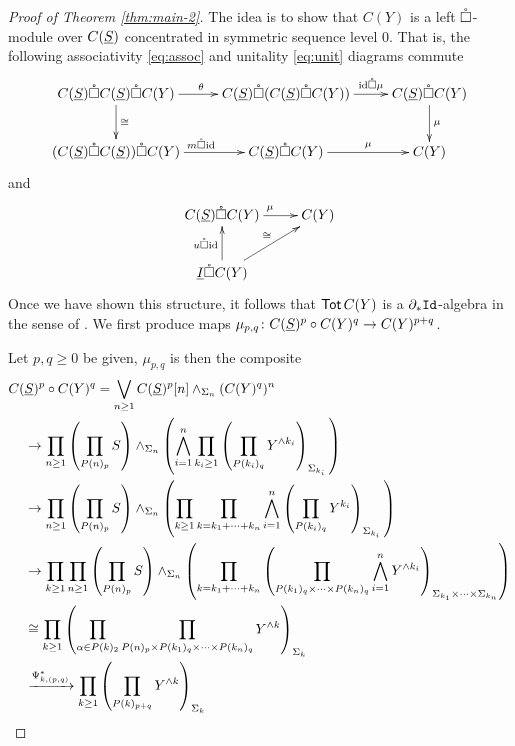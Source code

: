 \begin{proof}[Proof of Theorem \ref{thm:main-2}]The idea is to show that $C(Y)$ is a left $\mathring{\square}$-module over $C(\underline{S})$ concentrated in symmetric sequence level $0$. That is, the following associativity \eqref{eq:assoc} and unitality \eqref{eq:unit} diagrams commute \begin{equation} \label{eq:assoc}
    \xymatrix{
        C(\uS)\boxcirc C(\uS)\boxcirc C(Y) \ar[r]^{\theta} \ar[d]^-{\cong}
        &
        C(\uS)\boxcirc (C(\uS)\boxcirc C(Y)) \ar[r]^-{\id\boxcirc \mu}
        &
        C(\uS) \boxcirc C(Y) \ar[d]^-{\mu}
        \\
        (C(\uS)\boxcirc C(\uS))\boxcirc C(Y) \ar[r]^{m\boxcirc \id}
        &
        C(\uS)\boxcirc C(Y) \ar[r]^-{\mu}
        & 
        C(Y)
    }
    \end{equation}
    and 
    \begin{equation} \label{eq:unit} \xymatrix{
        C(\uS) \boxcirc C(Y) \ar[r]^{\mu}
        &
        C(Y)
        \\
        \underline{I}\boxcirc C(Y) \ar[u]^-{u \boxcirc \id} \ar[ur]^-{\cong}
    }
    \end{equation}
Once we have shown this structure, it follows that $\operatorname{\mathsf{Tot}} C(Y)$ is a $\partial_*\mathtt{Id}$-algebra in the sense of \cite[Definition 6.32]{Clark-1}. We first produce maps $\mu_{p,q}\colon C(\underline{S})^p \circ C(Y)^q \to C(Y)^{p+q}$. 

Let $p,q\geq 0$ be given, $\mu_{p,q}$ is then the composite \begin{align*} 
         C(&\underline{S})^p \circ C(Y)^q  = \bigvee_{n\geq 1} C(\underline{S})^p[n] \wedge_{\Sigma_n} (C(Y)^q)^n \\
         & \to \prod_{n\geq 1} \left( \prod_{P(n)_p} S \right) \wedge_{\Sigma_n} \left( \bigwedge_{i=1}^n \prod_{k_i\geq 1}\left(  \prod_{P(k_i)_q} Y^{\wedge k_i} \right)_{\Sigma_{k_i}} \, \right)
         \\
         & \to \prod_{n\geq 1} \left( \prod_{P(n)_p} S \right) \wedge_{\Sigma_n} \left( \prod_{k\geq 1} \prod_{k=k_1+\dots+k_n} \bigwedge_{i=1}^n \left( \prod_{P(k_i)_q} Y^{k_i} \right)_{\Sigma_{k_i}} \, \right)
         \\
         & \to \prod_{k\geq 1} \prod_{n\geq 1}  \left(\prod_{P(n)_p} S\right) \wedge_{\Sigma_n} \left( \prod_{k=k_1+\cdots+k_n} \left(\prod_{P(k_1)_q\times \cdots \times P(k_n)_q} \bigwedge_{i=1}^n Y^{\wedge k_i}\right)_{\Sigma_{k_1}\times \cdots \times \Sigma_{k_n}}\right)
         \\
         & \cong \prod_{k\geq 1}  \left(  \prod_{\alpha\in P(k)_2} \prod_{P(n)_p\times P(k_1)_q\times \cdots \times P(k_n)_q}  Y^{\wedge k}\right)_{\Sigma_k} \\
         & \xrightarrow{\Psi_{k,(p,q)}^*} \prod_{k \geq 1} \left( \prod_{P(k)_{p+q}} Y^{\wedge k} \right)_{\Sigma_k}
    \end{align*}
    

\end{proof}
